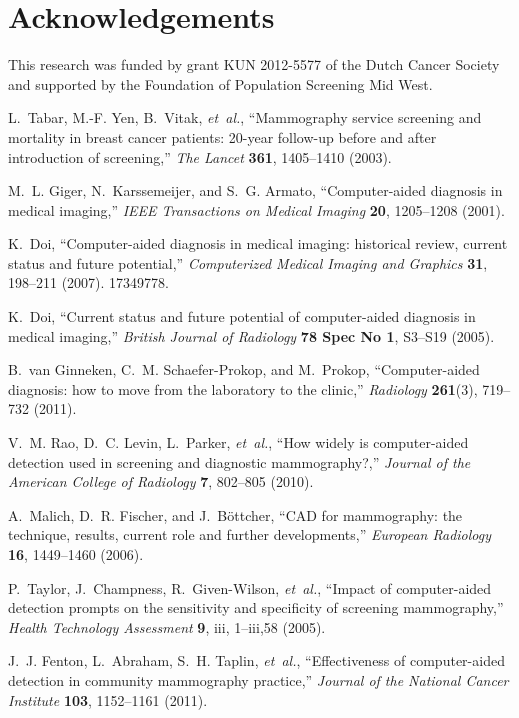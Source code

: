\documentclass[12pt]{spieman}  %
\begin{document}
\section*{Acknowledgements}
This research was funded by grant KUN 2012-5577 of the Dutch Cancer Society and supported by the Foundation of Population Screening Mid West.


\begin{thebibliography}{10}

L.~Tabar, M.-F. Yen, B.~Vitak, {\em et~al.}, ``Mammography service screening
  and mortality in breast cancer patients: 20-year follow-up before and after
  introduction of screening,'' {\em The Lancet} {\bf 361}, 1405--1410  (2003).

M.~L. Giger, N.~Karssemeijer, and S.~G. Armato, ``Computer-aided diagnosis in
  medical imaging,'' {\em IEEE Transactions on Medical Imaging} {\bf 20},
  1205--1208  (2001).

K.~Doi, ``Computer-aided diagnosis in medical imaging: historical review,
  current status and future potential,'' {\em Computerized Medical Imaging and
  Graphics} {\bf 31}, 198--211  (2007).
 17349778.

K.~Doi, ``Current status and future potential of computer-aided diagnosis in
  medical imaging,'' {\em British Journal of Radiology} {\bf 78 Spec No 1},
  S3--S19  (2005).

B.~van Ginneken, C.~M. Schaefer-Prokop, and M.~Prokop, ``Computer-aided
  diagnosis: how to move from the laboratory to the clinic,'' {\em Radiology}
  {\bf 261}(3), 719--732  (2011).

V.~M. Rao, D.~C. Levin, L.~Parker, {\em et~al.}, ``How widely is computer-aided
  detection used in screening and diagnostic mammography?,'' {\em Journal of
  the American College of Radiology} {\bf 7}, 802--805  (2010).

A.~Malich, D.~R. Fischer, and J.~B\"ottcher, ``{CAD} for mammography: the
  technique, results, current role and further developments,'' {\em European
  Radiology} {\bf 16}, 1449--1460  (2006).

P.~Taylor, J.~Champness, R.~Given-Wilson, {\em et~al.}, ``Impact of
  computer-aided detection prompts on the sensitivity and specificity of
  screening mammography,'' {\em Health Technology Assessment} {\bf 9}, iii,
  1--iii,58  (2005).

J.~J. Fenton, L.~Abraham, S.~H. Taplin, {\em et~al.}, ``Effectiveness of
  computer-aided detection in community mammography practice,'' {\em Journal of
  the National Cancer Institute} {\bf 103}, 1152--1161  (2011).


\end{thebibliography}
\end{document}
